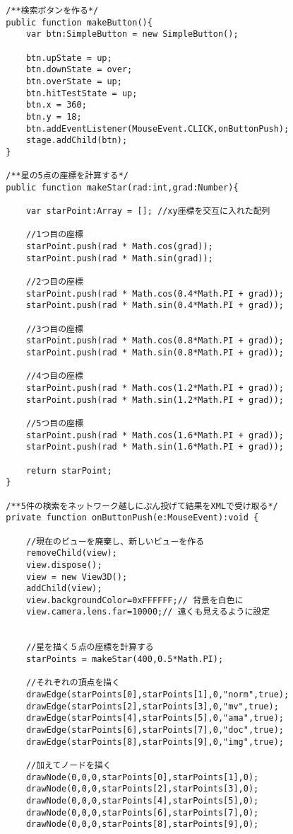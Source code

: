 {\begin{verbatim}
		/**検索ボタンを作る*/
		public function makeButton(){
			var btn:SimpleButton = new SimpleButton();
			
			btn.upState = up;
			btn.downState = over;
			btn.overState = up;
			btn.hitTestState = up;
			btn.x = 360;
			btn.y = 18;
			btn.addEventListener(MouseEvent.CLICK,onButtonPush);
			stage.addChild(btn);
		}
		
		/**星の5点の座標を計算する*/
		public function makeStar(rad:int,grad:Number){
			
			var starPoint:Array = []; //xy座標を交互に入れた配列
			
			//1つ目の座標
			starPoint.push(rad * Math.cos(grad));
			starPoint.push(rad * Math.sin(grad));
			
			//2つ目の座標
			starPoint.push(rad * Math.cos(0.4*Math.PI + grad));
			starPoint.push(rad * Math.sin(0.4*Math.PI + grad));
			
			//3つ目の座標
			starPoint.push(rad * Math.cos(0.8*Math.PI + grad));
			starPoint.push(rad * Math.sin(0.8*Math.PI + grad));
			
			//4つ目の座標
			starPoint.push(rad * Math.cos(1.2*Math.PI + grad));
			starPoint.push(rad * Math.sin(1.2*Math.PI + grad));
			
			//5つ目の座標
			starPoint.push(rad * Math.cos(1.6*Math.PI + grad));
			starPoint.push(rad * Math.sin(1.6*Math.PI + grad));
			
			return starPoint;
		}
		
		/**5件の検索をネットワーク越しにぶん投げて結果をXMLで受け取る*/
		private function onButtonPush(e:MouseEvent):void {
			
			//現在のビューを廃棄し、新しいビューを作る
			removeChild(view);
			view.dispose();
			view = new View3D();
			addChild(view);
			view.backgroundColor=0xFFFFFF;// 背景を白色に
			view.camera.lens.far=10000;// 遠くも見えるように設定
			
			
			//星を描く５点の座標を計算する
			starPoints = makeStar(400,0.5*Math.PI);
			
			//それぞれの頂点を描く
			drawEdge(starPoints[0],starPoints[1],0,"norm",true);
			drawEdge(starPoints[2],starPoints[3],0,"mv",true);
			drawEdge(starPoints[4],starPoints[5],0,"ama",true);
			drawEdge(starPoints[6],starPoints[7],0,"doc",true);
			drawEdge(starPoints[8],starPoints[9],0,"img",true);
			
			//加えてノードを描く
			drawNode(0,0,0,starPoints[0],starPoints[1],0);
			drawNode(0,0,0,starPoints[2],starPoints[3],0);
			drawNode(0,0,0,starPoints[4],starPoints[5],0);
			drawNode(0,0,0,starPoints[6],starPoints[7],0);
			drawNode(0,0,0,starPoints[8],starPoints[9],0);
			

\end{verbatim}}
